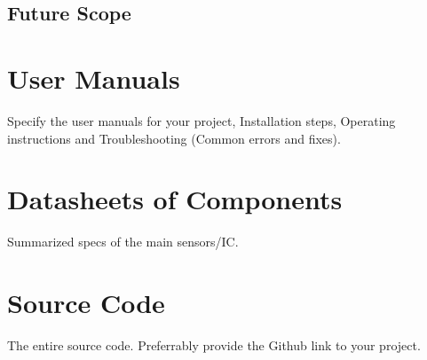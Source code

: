 \documentclass[minor, project]{gptcmdy}
\begin{document}
\section{Future Scope}


\nocite{*}


\appendix
\chapter{User Manuals}
Specify the user manuals for your project, Installation steps, Operating instructions and Troubleshooting (Common errors and fixes).

\chapter{Datasheets of Components}
Summarized specs of the main sensors/IC.

\chapter{Source Code}
The entire source code. Preferrably provide the Github link to your project.
\end{document}
